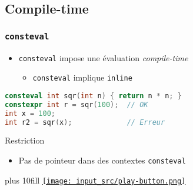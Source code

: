 \documentclass[C++.tex]{subfiles}
\begin{document}
\subsection*{Compile-time}
\begin{frame}[fragile]
	\frametitle{\lstinline|consteval|}
	\begin{itemize}
		\item \lstinline|consteval| impose une évaluation \textit{compile-time}


		\begin{itemize}
			\item \lstinline|consteval| implique \lstinline|inline|
		\end{itemize}
	\end{itemize}

	\begin{lstlisting}[language=C++]
consteval int sqr(int n) { return n * n; }
constexpr int r = sqr(100);  // OK
int x = 100;
int r2 = sqr(x);             // Erreur\end{lstlisting}

	\begin{alertblock}{Restriction}
		\begin{itemize}
			\item Pas de pointeur dans des contextes \lstinline|consteval|
		\end{itemize}
	\end{alertblock}

	\vskip 10mm plus 10fill
	\hfill
	\href{https://godbolt.org/#z:OYLghAFBqd5QCxAYwPYBMCmBRdBLAF1QCcAaPECAMzwBtMA7AQwFtMQByARg9KtQYEAysib0QXACx8BBAKoBnTAAUAHpwAMvAFYTStJg1DIApACYAQuYukl9ZATwDKjdAGFUtAK4sGe1wAyeAyYAHI%2BAEaYxCCSZqQADqgKhE4MHt6%2BekkpjgJBIeEsUTFxtpj2eQxCBEzEBBk%2BflzllWk1dQQFYZHRegq19Y1ZLQOd3UUlEgCUtqhexMjsHOYAzMHI3lgA1Carbk4DxJise9gmGgCCF5doDAOYAG5i28EE2woAjsQQb9sM0xuJgA7FYrtttscCAsGP9tgAqf57MHXYEAESBVzuD1UCWIr0EH2%2BZl%2BhIBQNBNwhUJhcMRDGRFIxVxufxYTGCEEBLMp4N2vMuEIh2IImFx%2BL%2B/FQu1WaKJPy4Gg0gNWKKFHwI6BAKHm7z2bn12ylMoN%2B12ZjMJgArG4GRbGXyQczro6BeqRWK8QT3qoZXLFQ7BUKPeLvUbUNK9nKvj9VCq1UKBlqdV49ftDcb9YbzJabXbLaqqfznUCzOsqNsNEWQQmIX9fVHtoqq4W%2BXXCZnZfKIHHA%2Bqk9q0KmTRmIyOzTnrbbJ62g07S6tXHgqJjrmXl5Xq26hfW/U2lX2dx2x42YyTe7P%2B5rB7rx25w5H0xP7XmZwn5yyy0uVzznRxZrQnBWrwfgcFopCoJwBqWNYHzzIsmDmqsPCkAQmj/rMADWIBWho%2BicJIIHoRBnC8AoIB4WhYH/qQcCwEgYqYMgqYkOQlB1MACjKIYFRCAgqAAO6gShaAsAkdBMFU3EhLQfGCaB4GieJ9AxMAXAWqQSl0NEoSsMsvBaSpADyqZyUJxGMcglzEJxpGkJZNT4KBvD8IIIhiOwUgyIIigqOo1GkLoLQGEYKDWNY%2Bh4BE5GwMwbAgBEEYDKQjx9NwwLAdMsyoAkVTkRwAC0SZRqYMGWGYGjbAVADqYi0FV1VigQxBMFVCSYOghiOMgZHwUs/SasE0m8fx5ncLwzWYMsKECS1CToQBQFEQFkEcNgqhMSx%2BKqAAHAAbAVe2SNswDIMgTZmAAdGY2wQNBViWKQ2y4IQJBIVw0wTQtswICcWAxFypDYbh%2BEcIRpAKbwq1kRRqHfaDZjLeB0Nw9RWUpdEKTOJIQA%3D}{\texttt{[image: input\_src/play-button.png]}}
\end{frame}
\end{document}
